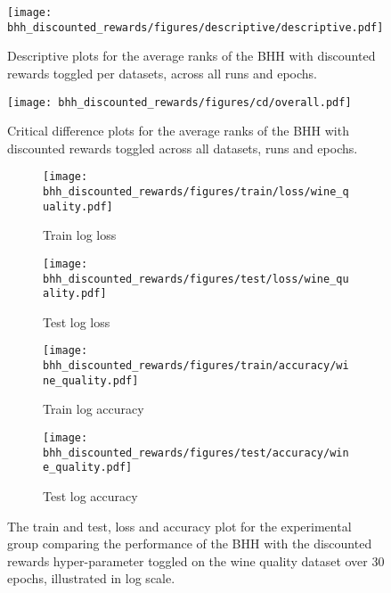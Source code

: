 \begin{figure}[htbp]
	\centering
	\texttt{[image: bhh\_discounted\_rewards/figures/descriptive/descriptive.pdf]}
	\caption{Descriptive plots for the average ranks of the \acs{BHH} with discounted rewards toggled per datasets, across all runs and epochs.}
	\label{fig:results:discounted_rewards:descriptive:descriptive}
\end{figure}

\begin{figure}[htbp]
	\centering
	\texttt{[image: bhh\_discounted\_rewards/figures/cd/overall.pdf]}
	\caption{Critical difference plots for the average ranks of the \acs{BHH} with discounted rewards toggled across all datasets, runs and epochs.}
	\label{fig:results:discounted_rewards:descriptive:cd}
\end{figure}

\begin{figure}[htbp]
	\begin{subfigure}{0.5\textwidth}
		\centering
		\texttt{[image: bhh\_discounted\_rewards/figures/train/loss/wine\_quality.pdf]}
		\caption{Train log loss}
		\label{fig:results:discounted_rewards:figures:loss:train:wine_quality}
	\end{subfigure}
	\begin{subfigure}{0.5\textwidth}
		\centering
		\texttt{[image: bhh\_discounted\_rewards/figures/test/loss/wine\_quality.pdf]}
		\caption{Test log loss}
		\label{fig:results:discounted_rewards:figures:loss:test:wine_quality}
	\end{subfigure}
	\par\bigskip
	\begin{subfigure}{0.5\textwidth}
		\centering
		\texttt{[image: bhh\_discounted\_rewards/figures/train/accuracy/wine\_quality.pdf]}
		\caption{Train log accuracy}
		\label{fig:results:discounted_rewards:figures:accuracy:train:wine_quality}
	\end{subfigure}
	\begin{subfigure}{0.5\textwidth}
		\centering
		\texttt{[image: bhh\_discounted\_rewards/figures/test/accuracy/wine\_quality.pdf]}
		\caption{Test log accuracy}
		\label{fig:results:discounted_rewards:figures:accuracy:test:wine_quality}
	\end{subfigure}
	\par\bigskip
	\caption{The train and test, loss and accuracy plot for the experimental group comparing the performance of the \acs{BHH} with the discounted rewards hyper-parameter toggled on the wine quality dataset over 30 epochs, illustrated in log scale.}
	\label{fig:results:discounted_rewards:figures:wine_quality}
\end{figure}



